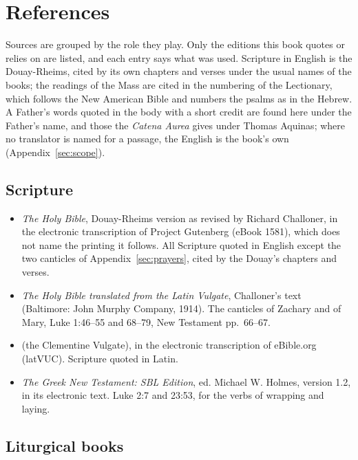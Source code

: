 \section{References}\label{sec:references}

Sources are grouped by the role they play. Only the editions this book quotes or relies on are
listed, and each entry says what was used. Scripture in English is the Douay-Rheims, cited by its
own chapters and verses under the usual names of the books; the readings of the Mass are cited in the numbering of the
Lectionary, which follows the New American Bible and numbers the psalms as in the Hebrew. A
Father's words quoted in the body with a short credit are found here under the Father's name, and
those the \textit{Catena Aurea} gives under Thomas Aquinas; where no translator is named for a
passage, the English is the book's own (Appendix~\ref{sec:scope}).

\subsection{Scripture}

\begin{itemize}[leftmargin=1.3em, itemsep=0.3em]
\item \textit{The Holy Bible}, Douay-Rheims version as revised by Richard Challoner, in the
electronic transcription of Project Gutenberg (eBook 1581), which does not name the printing it
follows. All Scripture quoted in English except the two canticles of Appendix~\ref{sec:prayers},
cited by the Douay's chapters and verses.
\item \textit{The Holy Bible translated from the Latin Vulgate}, Challoner's text (Baltimore: John
Murphy Company, 1914). The canticles of Zachary and of Mary, Luke 1:46--55 and 68--79, New
Testament pp.~66--67.
\item {} (the Clementine Vulgate), in the electronic
transcription of eBible.org (latVUC). Scripture quoted in Latin.
\item \textit{The Greek New Testament: SBL Edition}, ed. Michael W. Holmes, version 1.2, in its
electronic text. Luke 2:7 and 23:53, for the verbs of wrapping and laying.
\end{itemize}

\subsection{Liturgical books}

